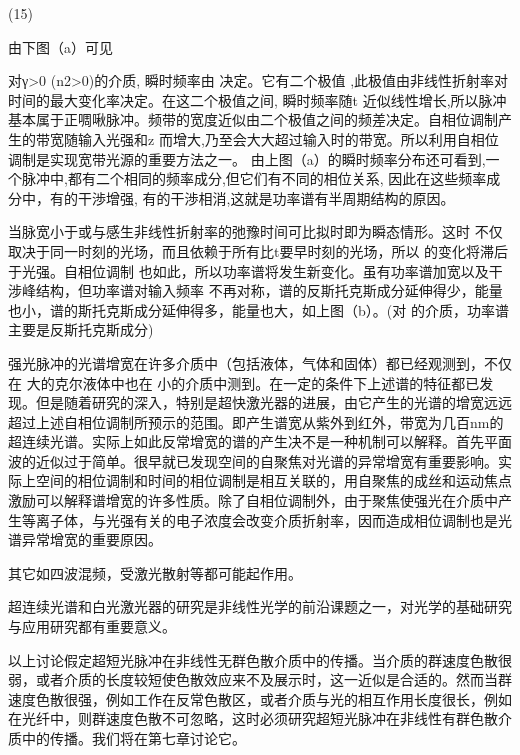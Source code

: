                                           (15)

由下图（a）可见
 
对γ>0 (n2>0)的介质, 瞬时频率由 决定。它有二个极值 ,此极值由非线性折射率对时间的最大变化率决定。在这二个极值之间, 瞬时频率随t 近似线性增长,所以脉冲基本属于正啁啾脉冲。频带的宽度近似由二个极值之间的频差决定。自相位调制产生的带宽随输入光强和z 而增大,乃至会大大超过输入时的带宽。所以利用自相位调制是实现宽带光源的重要方法之一。 由上图（a）的瞬时频率分布还可看到,一个脉冲中,都有二个相同的频率成分,但它们有不同的相位关系, 因此在这些频率成分中，有的干渉增强, 有的干渉相消,这就是功率谱有半周期结构的原因。

当脉宽小于或与感生非线性折射率的弛豫时间可比拟时即为瞬态情形。这时 不仅取决于同一时刻的光场，而且依赖于所有比t要早时刻的光场，所以 的变化将滞后于光强。自相位调制 也如此，所以功率谱将发生新变化。虽有功率谱加宽以及干涉峰结构，但功率谱对输入频率 不再对称，谱的反斯托克斯成分延伸得少，能量也小，谱的斯托克斯成分延伸得多，能量也大，如上图（b）。(对 的介质，功率谱主要是反斯托克斯成分)

强光脉冲的光谱增宽在许多介质中（包括液体，气体和固体）都已经观测到，不仅在 大的克尔液体中也在 小的介质中测到。在一定的条件下上述谱的特征都已发现。但是随着研究的深入，特别是超快激光器的进展，由它产生的光谱的增宽远远超过上述自相位调制所预示的范围。即产生谱宽从紫外到红外，带宽为几百nm的超连续光谱。实际上如此反常增宽的谱的产生决不是一种机制可以解释。首先平面波的近似过于简单。很早就已发现空间的自聚焦对光谱的异常增宽有重要影响。实际上空间的相位调制和时间的相位调制是相互关联的，用自聚焦的成丝和运动焦点激励可以解释谱增宽的许多性质。除了自相位调制外，由于聚焦使强光在介质中产生等离子体，与光强有关的电子浓度会改变介质折射率，因而造成相位调制也是光谱异常增宽的重要原因。

其它如四波混频，受激光散射等都可能起作用。   

超连续光谱和白光激光器的研究是非线性光学的前沿课题之一，对光学的基础研究与应用研究都有重要意义。

以上讨论假定超短光脉冲在非线性无群色散介质中的传播。当介质的群速度色散很弱，或者介质的长度较短使色散效应来不及展示时，这一近似是合适的。然而当群速度色散很强，例如工作在反常色散区，或者介质与光的相互作用长度很长，例如在光纤中，则群速度色散不可忽略，这时必须研究超短光脉冲在非线性有群色散介质中的传播。我们将在第七章讨论它。

